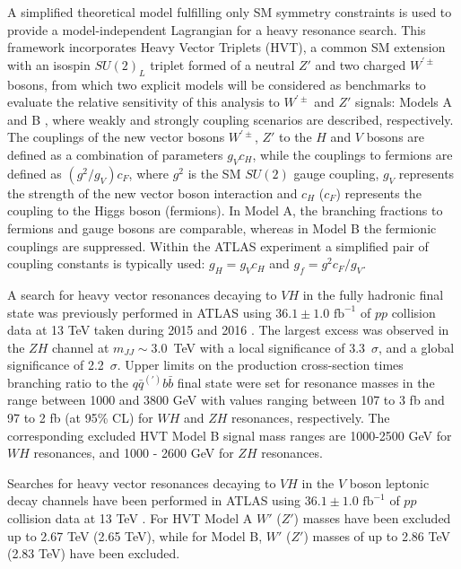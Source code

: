 A simplified theoretical model \cite{Pappadopulo:2014qza} fulfilling only SM symmetry constraints is used to provide a model-independent Lagrangian for a heavy resonance search.
This framework incorporates Heavy Vector Triplets (HVT), a common SM extension with an isospin $SU(2)_{L}$ triplet formed of a neutral $Z'$ and two charged $W^{\prime \pm}$ bosons, from which two explicit models will be considered as benchmarks to evaluate the relative sensitivity of this analysis to $W^{\prime \pm}$ and $Z'$ signals: Models A and B \cite{Pappadopulo:2014qza}, where weakly and strongly coupling scenarios are described, respectively.
The couplings of the new vector bosons $W^{\prime \pm}$, $Z'$ to the $H$ and $V$ bosons are defined as a combination of parameters $g_{V}c_{H}$, while the couplings to fermions are defined as $(g^{2}/g_{V})c_{F}$, where $g^2$ is the SM $SU(2)$ gauge coupling, $g_V$ represents the strength of the new vector boson interaction and $c_{H}$ ($c_{F}$) represents the coupling to the Higgs boson (fermions).
In Model A, the branching fractions to fermions and gauge bosons are comparable, whereas in Model B the fermionic couplings are suppressed.
Within the ATLAS experiment a simplified pair of coupling constants is typically used: $g_H = g_V c_H$ and $g_f=g^2 c_F / g_V$.

A search for heavy vector resonances decaying to $VH$ in the fully hadronic final state was previously performed in ATLAS using $36.1\pm1.0\text{~fb}^{-1}$ of $pp$ collision data at 13 TeV taken during 2015 and 2016 \cite{Aaboud:2017ahz}.
The largest excess was observed in the $ZH$ channel at $m_{JJ}\sim3.0$~TeV with a local significance of 3.3~$\sigma$, and a  global significance of  2.2~$\sigma$.
Upper limits on the production cross-section times branching ratio to the $q\bar{q}^{(\prime)}b\bar{b}$ final state were set for resonance masses in the range between 1000 and 3800 GeV with values ranging between 107 to 3 fb and 97 to 2 fb (at 95\% CL) for $WH$ and $ZH$ resonances, respectively.
The corresponding excluded HVT Model B signal mass ranges are 1000-2500 GeV for $WH$ resonances, and 1000 - 2600 GeV for $ZH$ resonances.

Searches for heavy vector resonances decaying to $VH$ in the $V$ boson leptonic decay channels have been performed in ATLAS using $36.1\pm1.0\text{~fb}^{-1}$ of $pp$ collision data at 13 TeV \cite{EXOT-2016-10}.
For HVT Model A $W'$ ($Z'$) masses have been excluded up to 2.67 TeV (2.65 TeV), while for Model B, $W'$ ($Z'$) masses of up to 2.86 TeV (2.83 TeV) have been excluded.


